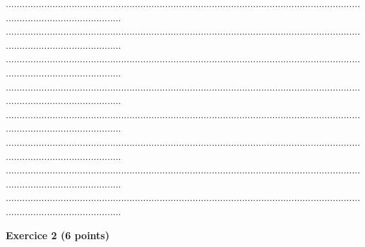 \documentclass{article}
\begin{document}
\begin{footnotesize}
\begin{enumerate}
    ...........................................................................................................................................................................\newline
    ...........................................................................................................................................................................\newline
    ...........................................................................................................................................................................\newline
    ...........................................................................................................................................................................\newline
    ...........................................................................................................................................................................\newline
    ...........................................................................................................................................................................\newline
    ...........................................................................................................................................................................\newline
    ...........................................................................................................................................................................\newline\newline
\end{enumerate}\newpage
\end{footnotesize}
\noindent\textbf{Exercice 2 (6 points)}\newline
\end{document}
